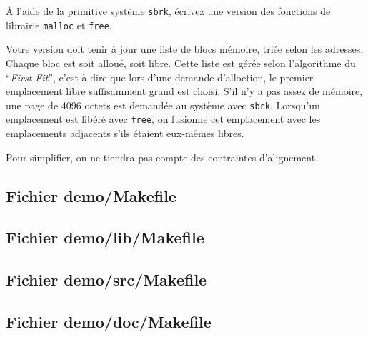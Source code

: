 \question

\`A l'aide de la primitive système {\tt sbrk}, écrivez une version
des fonctions de librairie {\tt malloc} et {\tt free}.

Votre version doit tenir à jour une liste de blocs mémoire, triée
selon les adresses. Chaque bloc
est soit alloué, soit libre. Cette liste est gérée selon l'algorithme
du ``{\em First Fit\/}'', c'est à dire que lors d'une demande
d'alloction, le premier emplacement libre suffisamment grand est
choisi. S'il n'y a pas assez de mémoire, une page de 4096 octets
est demandée au système avec {\tt sbrk}. Lorsqu'un emplacement est
libéré avec {\tt free}, on fusionne cet emplacement avec les
emplacements adjacents s'ils étaient eux-mêmes libres.

Pour simplifier, on ne tiendra pas compte des contraintes
d'alignement.


\cleardoublepage
    \label {makefile}

\subsection* {Fichier demo/Makefile}

{\small
{}
}

\clearpage
\subsection* {Fichier demo/lib/Makefile}

{\small
{}
}

\clearpage
\subsection* {Fichier demo/src/Makefile}

{\small
{}
}

\subsection* {Fichier demo/doc/Makefile}

{\small
{}
}
\label {makefile-fin}
